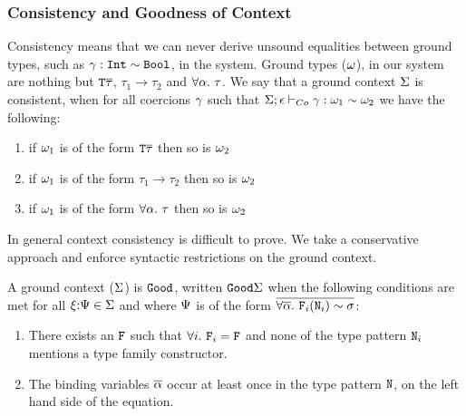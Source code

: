 \documentclass[format=acmsmall,manuscript,review,screen,nonacm,margin=1in,11pt]{acmart}
\begin{document}
\subsubsection{Consistency and Goodness of Context}\label{subsec:tf-closed-consistency}
Consistency means that we can never derive unsound equalities between ground types,
such as $\gamma:\texttt{Int}\mathrel{\sim}\texttt{Bool}$, in the system. Ground types ($\omega$), in our system are
nothing but $\texttt{T}\overline{\tau}$, $\tau_1\to\tau_2$ and $\forall\alpha.~\tau$.
We say that a ground context $\Sigma$ is consistent, when for all coercions $\gamma$
such that $\Sigma;\epsilon \vdash_{Co} \gamma : \omega_1 \mathrel{\sim} \omega_2$ we have the following:
\begin{enumerate}
\item if $\omega_1$ is of the form $\texttt{T}\overline{\tau}$ then so is $\omega_2$
\item if $\omega_1$ is of the form $\tau_1\to\tau_2$ then so is $\omega_2$
\item if $\omega_1$ is of the form $\forall\alpha.~\tau$ then so is $\omega_2$
\end{enumerate}
In general context consistency is difficult to prove. We take a conservative approach
and enforce syntactic restrictions on the ground context.
\begin{property}[$\Good~\GEnv$]
  A ground context ($\Sigma$) is $\texttt{Good}$, written $\texttt{Good}\Sigma$ when
  the following conditions are met for all $\xi{:}\Psi\in\Sigma$ and
  where $\Psi$ is of the form $\overline{\forall\overline{\alpha}.~\texttt{F}_i(\texttt{N}_i)\mathrel{\sim}\sigma}$:
  \begin{enumerate}
  \item There exists an $\texttt{F}$ such that  $\forall i.~\texttt{F}_i = \texttt{F}$ and none of the type pattern $\texttt{N}_i$ mentions a type family constructor.
  \item The binding variables $\overline{\alpha}$ occur at least once in the type pattern $\texttt{N}$,
    on the left hand side of the equation.
  \end{enumerate}
\end{property}
\end{document}
